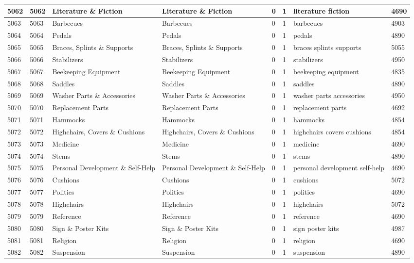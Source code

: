 \begin{longtable}{|l|l|l|l|l|l|l|l|}
5062 & 5062 & Literature \& Fiction & Literature \& Fiction & 0 & 1 & literature fiction & 4690 \\ \hline 
5063 & 5063 & Barbecues & Barbecues & 0 & 1 & barbecues & 4903 \\ \hline 
5064 & 5064 & Pedals & Pedals & 0 & 1 & pedals & 4890 \\ \hline 
5065 & 5065 & Braces, Splints \& Supports & Braces, Splints \& Supports & 0 & 1 & braces splints supports & 5055 \\ \hline 
5066 & 5066 & Stabilizers & Stabilizers & 0 & 1 & stabilizers & 4950 \\ \hline 
5067 & 5067 & Beekeeping Equipment & Beekeeping Equipment & 0 & 1 & beekeeping equipment & 4835 \\ \hline 
5068 & 5068 & Saddles & Saddles & 0 & 1 & saddles & 4890 \\ \hline 
5069 & 5069 & Washer Parts \& Accessories & Washer Parts \& Accessories & 0 & 1 & washer parts accessories & 4950 \\ \hline 
5070 & 5070 & Replacement Parts & Replacement Parts & 0 & 1 & replacement parts & 4692 \\ \hline 
5071 & 5071 & Hammocks & Hammocks & 0 & 1 & hammocks & 4854 \\ \hline 
5072 & 5072 & Highchairs, Covers \& Cushions & Highchairs, Covers \& Cushions & 0 & 1 & highchairs covers cushions & 4854 \\ \hline 
5073 & 5073 & Medicine & Medicine & 0 & 1 & medicine & 4690 \\ \hline 
5074 & 5074 & Stems & Stems & 0 & 1 & stems & 4890 \\ \hline 
5075 & 5075 & Personal Development \& Self-Help & Personal Development \& Self-Help & 0 & 1 & personal development self-help & 4690 \\ \hline 
5076 & 5076 & Cushions & Cushions & 0 & 1 & cushions & 5072 \\ \hline 
5077 & 5077 & Politics & Politics & 0 & 1 & politics & 4690 \\ \hline 
5078 & 5078 & Highchairs & Highchairs & 0 & 1 & highchairs & 5072 \\ \hline 
5079 & 5079 & Reference & Reference & 0 & 1 & reference & 4690 \\ \hline 
5080 & 5080 & Sign \& Poster Kits & Sign \& Poster Kits & 0 & 1 & sign poster kits & 4987 \\ \hline 
5081 & 5081 & Religion & Religion & 0 & 1 & religion & 4690 \\ \hline 
5082 & 5082 & Suspension & Suspension & 0 & 1 & suspension & 4890 \\ \hline 

\end{longtable}
